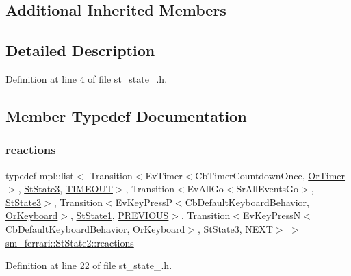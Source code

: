 \subsection*{Additional Inherited Members}


\subsection{Detailed Description}


Definition at line 4 of file st\+\_\+state\+\_.\+h.



\subsection{Member Typedef Documentation}
\mbox{\label{structsm__ferrari_1_1StState2_a22ae0b8d881cce5fe45b33e73ed73c3f}} 
\subsubsection{\texorpdfstring{reactions}{reactions}}
{\footnotesize\ttfamily typedef mpl\+::list$<$ Transition$<$Ev\+Timer$<$Cb\+Timer\+Countdown\+Once, \hyperlink{classsm__ferrari_1_1OrTimer}{Or\+Timer}$>$, \hyperlink{structsm__ferrari_1_1StState3}{St\+State3}, \hyperlink{structsm__ferrari_1_1StState2_1_1TIMEOUT}{T\+I\+M\+E\+O\+UT}$>$, Transition$<$Ev\+All\+Go$<$Sr\+All\+Events\+Go$>$, \hyperlink{structsm__ferrari_1_1StState3}{St\+State3}$>$, Transition$<$Ev\+Key\+PressP$<$Cb\+Default\+Keyboard\+Behavior, \hyperlink{classsm__ferrari_1_1OrKeyboard}{Or\+Keyboard}$>$, \hyperlink{structsm__ferrari_1_1StState1}{St\+State1}, \hyperlink{structsm__ferrari_1_1StState2_1_1PREVIOUS}{P\+R\+E\+V\+I\+O\+US}$>$, Transition$<$Ev\+Key\+PressN$<$Cb\+Default\+Keyboard\+Behavior, \hyperlink{classsm__ferrari_1_1OrKeyboard}{Or\+Keyboard}$>$, \hyperlink{structsm__ferrari_1_1StState3}{St\+State3}, \hyperlink{structsm__ferrari_1_1StState2_1_1NEXT}{N\+E\+XT}$>$ $>$ \hyperlink{structsm__ferrari_1_1StState2_a22ae0b8d881cce5fe45b33e73ed73c3f}{sm\+\_\+ferrari\+::\+St\+State2\+::reactions}}



Definition at line 22 of file st\+\_\+state\+\_.\+h.



